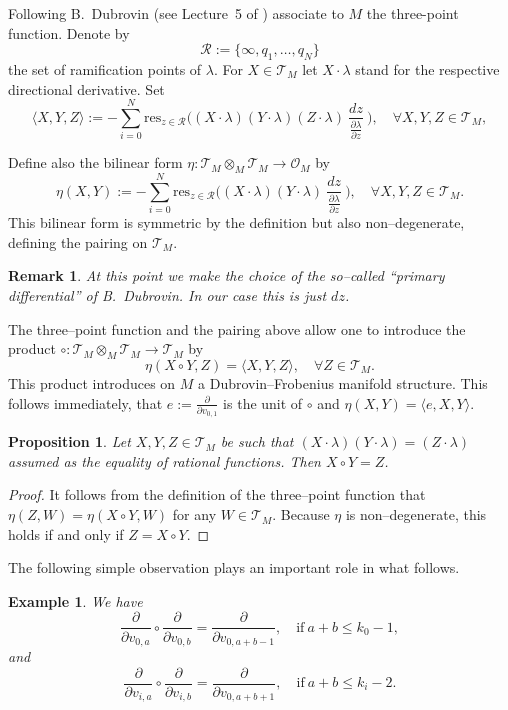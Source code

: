 \documentclass[12pt,a4paper]{amsart}
\def\O{{\mathcal O}}
\def\T{{\mathcal T}}
\def\res{{\mathrm{res}}}
\newcommand{\p}{{\partial}}
\newcommand{\<}{\left<}
\renewcommand{\>}{\right>}
\newtheorem{proposition}[theorem]{Proposition}
\newtheorem{example}[theorem]{Example}
\newtheorem{remark}[theorem]{Remark}
\numberwithin{equation}{section}
\begin{document}
Following B.~Dubrovin (see Lecture~5 of \cite{D2}) associate to $M$ the three-point function.
Denote by
\[
 \mathcal{R} := \lbrace \infty, q_{1},\dots, q_{N} \rbrace
\]
the set of ramification points of $\lambda$.
For $X \in \T_M$ let $X \cdot \lambda$ stand for the respective directional derivative. Set
\begin{equation}\label{eq: three-point function}
   \langle X,Y,Z \rangle := - \sum_{i=0}^N \res_{z \in \mathcal{R}} \Big( (X \cdot \lambda)(Y \cdot \lambda)(Z \cdot \lambda) \ \frac{dz }{\frac{\p \lambda}{\p z}} \ \Big), \quad \forall X,Y,Z \in \T_M,
\end{equation}

Define also the bilinear form $\eta: \T_M \otimes_M \T_M \to \O_M$ by
\[
    \eta(X,Y) := - \sum_{i=0}^N \res_{z \in \mathcal{R}} \Big( (X \cdot \lambda)(Y \cdot \lambda) \ \frac{dz }{\frac{\p \lambda}{\p z}} \ \Big), \quad \forall X,Y,Z \in \T_M.
\]
This bilinear form is symmetric by the definition but also non--degenerate, defining the pairing on $\T_M$.

\begin{remark}
    At this point we make the choice of the so--called ``primary differential'' of B.~Dubrovin. In our case this is just $dz$.
\end{remark}


The three--point function and the pairing above allow one to introduce the product $\circ: \T_M \otimes_M \T_M \to \T_M$ by
\[
    \eta(X \circ Y, Z) = \langle X,Y, Z \rangle, \quad \forall Z \in \T_M.
\]
This product introduces on $M$ a Dubrovin--Frobenius manifold structure. This follows immediately, that $e := \frac{\p}{\p v_{0,1}}$ is the unit of $\circ$ and $\eta(X,Y) = \langle e , X, Y \rangle$.


\begin{proposition}\label{prop: low ramification products}
  Let $X,Y,Z \in \T_M$ be such that $(X \cdot \lambda)(Y \cdot \lambda) = (Z \cdot \lambda)$
    assumed as the equality of rational functions. Then $X \circ Y = Z$.
\end{proposition}
\begin{proof}
    It follows from the definition of the three--point function that $\eta(Z,W) = \eta(X \circ Y, W)$ for any $W \in \T_M$. Because $\eta$ is non--degenerate, this holds if and only if $Z = X \circ Y$.
\end{proof}

The following simple observation plays an important role in what follows.
\begin{example}\label{example: v-products in same sector}
    We have
    \[
     \frac{\p}{\p v_{0,a}} \circ \frac{\p}{\p v_{0,b}} = \frac{\p}{\p v_{0,a+b-1}}, \quad \text{if} \ a + b \le k_0-1,
    \]
    and
    \[
     \frac{\p}{\p v_{i,a}} \circ \frac{\p}{\p v_{i,b}} = \frac{\p}{\p v_{0,a+b+1}}, \quad \text{if} \ a + b \le k_i-2.
    \]

\end{example}
\end{document}
